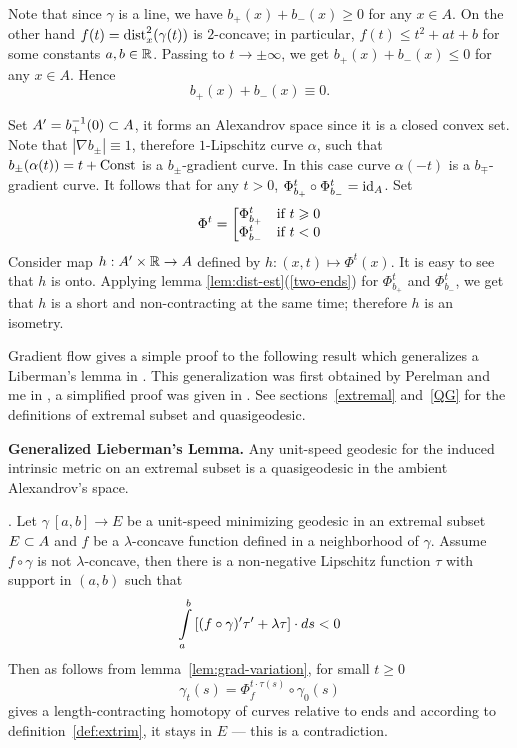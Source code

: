 \documentclass{article}
\begin{document}
Note that since $\gamma$ is a line, we have $b_+(x)+b_-(x)\ge0$ for any $x\in A$.
On the other hand $f(t)={\dist^2_x(\gamma(t))}$ is $2$-concave; in particular, $f(t)\le t^2+at+b$ for some constants $a,b\in\RR$. 
Passing to $t\to\pm\infty$, we get $b_+(x)+b_-(x)\le0$ for any $x\in A$.
Hence $$b_+(x)+b_-(x)\equiv 0.$$

Set $A'=b_+^{-1}(0)\i A$, it forms an Alexandrov space since it is a closed convex set.
Note that $|\nabla b_\pm|\equiv 1$, therefore $1$-Lipschitz curve $\alpha$, such that $b_\pm(\alpha(t))=t+\Const$ is a $b_\pm$-gradient curve. 
In this case curve $\alpha(-t)$ is a $b_\mp$-gradient curve.
It follows that for any $t>0$, $\Phi_{b_+}^t\circ\Phi_{b_-}^t=\id_A$.
Set
$$\Phi^t=\left[\begin{matrix}
\Phi_{b_+}^t&\hbox{if}\ t\ge0\\
\Phi_{b_-}^t&\hbox{if}\ t<0
               \end{matrix}\right.$$
Consider map $h:A'\times \RR\to A$ defined by $h:(x,t)\mapsto \Phi^t(x)$.
It is easy to see that $h$ is onto.
Applying lemma \ref{lem:dist-est}(\ref{two-ends}) for $\Phi_{b_+}^t$ and $\Phi_{b_-}^t$, we get that $h$ is a short and non-contracting at the same time; therefore $h$ is an isometry.\qeds

Gradient flow gives a simple proof to the following result which generalizes a Liberman's lemma in \cite{liberman}. 
This generalization was first obtained by Perelman and me in
\cite[5.3]{perelman-petrunin:extremal}, 
a simplified proof was given in
\cite[1.1]{petrunin:extremal}.
See sections~\ref{extremal} and~\ref{QG}  
for the definitions of extremal subset and
quasigeodesic. 

\begin{thm}{\bf Generalized Lieberman's Lemma.}\label{lib-lem} Any unit-speed geodesic for the
induced intrinsic metric on an extremal subset is a quasigeodesic in the ambient
Alexandrov's space.
\end{thm}


\Proof. Let $\gamma\:[a,b]\to E$ be a unit-speed minimizing geodesic in an extremal subset
$E\i A$ and $f$ be a $\lambda$-concave function defined in a neighborhood of
$\gamma$.
Assume $f\circ\gamma$ is not $\lambda$-concave, then there is a non-negative
Lipschitz function $\tau$ with support in $(a,b)$ such that
$$\int\limits_a^b\l[(f\circ\gamma)'\tau'+\lambda\tau\r]\cdot d s< 0$$
Then as follows from lemma~\ref{lem:grad-variation}, for small $t\ge 0$
$$\gamma_t(s)=\Phi^{t\cdot\tau(s)}_f \circ\gamma_0(s)$$
gives a length-contracting homotopy of curves relative to ends and according to
definition~\ref{def:extrim}, it stays in $E$ --- this is a contradiction.\qeds
\end{document}
